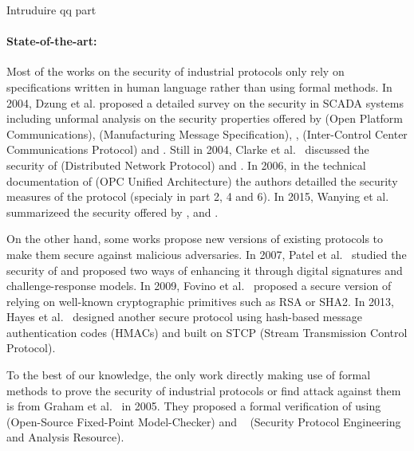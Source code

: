 \TODO Intruduire \opcua qq part


\paragraph{State-of-the-art:}\label{sec:intro_sota}

Most of the works on the security of industrial protocols only rely on
specifications written in human language rather than using formal methods.
In 2004, Dzung et al. proposed a detailed survey on the security in SCADA
systems including unformal analysis on the security properties offered by \opc (Open
Platform Communications), \mms (Manufacturing Message Specification),
, \iccp (Inter-Control Center Communications Protocol) and \etherip.
Still in 2004, Clarke et al.~\cite{CR04} discussed the security of \dnp
(Distributed Network Protocol) and \iccp.
In 2006, in the technical documentation of \opcua (OPC Unified Architecture) the
authors detailled the security measures of the protocol (specialy in part 2, 4
and 6).
In 2015, Wanying et al. summarizeed the security offered by \modbus, \dnp and
\opcua.

On the other hand, some works propose new versions of existing protocols to make
them secure against malicious adversaries.
In 2007, Patel et al.~\cite{PY07} studied the security of \dnp and proposed two
ways of enhancing it through digital signatures and challenge-response models.
In 2009, Fovino et al.~\cite{FCMT09} proposed a secure version of \modbus
relying on well-known cryptographic primitives such as RSA or SHA2.
In 2013, Hayes et al.~\cite{HE13} designed another secure \modbus protocol using
hash-based message authentication codes (HMACs) and built on STCP (Stream
Transmission Control Protocol).

To the best of our knowledge, the only work directly making use of formal
methods to prove the security of industrial protocols or find attack against
them is from Graham et al.~\cite{GP05} in 2005.
They proposed a formal verification of \dnp using \ofmc~\cite{BMV03} (Open-Source Fixed-Point Model-Checker) and
\spear~\cite{SH01} (Security Protocol Engineering and Analysis Resource).

